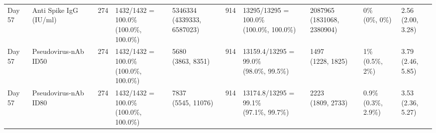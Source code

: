 \documentclass[]{book}
\theoremstyle{definition}
\theoremstyle{definition}
\theoremstyle{definition}
\newcommand{\1}{\mathbbm{1}}
\begin{document}
\begin{landscape}
\begin{ThreePartTable}
\begin{longtable}[t]{>{\raggedright\arraybackslash}p{1cm}lllllllll}
\addlinespace
Day 57 & Anti Spike IgG (IU/ml) & 274 & \makecell[l]{1432/1432 = 100.0\%\\(100.0\%, 100.0\%)} & \makecell[l]{5346334\\(4339333, 6587023)} & 914 & \makecell[l]{13295/13295 = 100.0\%\\(100.0\%, 100.0\%)} & \makecell[l]{2087965\\(1831068, 2380904)} & \makecell[l]{0\%\\(0\%, 0\%)} & \makecell[l]{2.56\\(2.00, 3.28)}\\
Day 57 & Pseudovirus-nAb ID50 & 274 & \makecell[l]{1432/1432 = 100.0\%\\(100.0\%, 100.0\%)} & \makecell[l]{5680\\(3863, 8351)} & 914 & \makecell[l]{13159.4/13295 = 99.0\%\\(98.0\%, 99.5\%)} & \makecell[l]{1497\\(1228, 1825)} & \makecell[l]{1\%\\(0.5\%, 2\%)} & \makecell[l]{3.79\\(2.46, 5.85)}\\
Day 57 & Pseudovirus-nAb ID80 & 274 & \makecell[l]{1432/1432 = 100.0\%\\(100.0\%, 100.0\%)} & \makecell[l]{7837\\(5545, 11076)} & 914 & \makecell[l]{13174.8/13295 = 99.1\%\\(97.1\%, 99.7\%)} & \makecell[l]{2223\\(1809, 2733)} & \makecell[l]{0.9\%\\(0.3\%, 2.9\%)} & \makecell[l]{3.53\\(2.36, 5.27)}\\*
\end{longtable}
\end{ThreePartTable}


\clearpage


\end{landscape}
\end{document}
